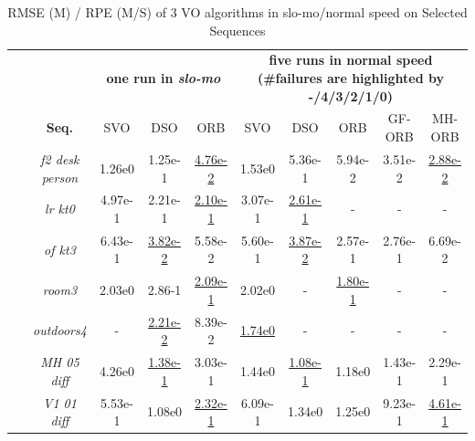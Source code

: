 \begin{table}[t]
	\small
	\centering
	\caption{RMSE (M) / RPE (M/S) of 3 VO algorithms in slo-mo/normal speed on Selected Sequences}
	\begin{tabular}{c|c||c|c|c||c|c|c|c|c}
		\toprule[1pt]
		\midrule[0.1pt]
		\textbf{ } & 
		& \multicolumn{3}{c||}{\bfseries \small one run in \textit{slo-mo}}
		& \multicolumn{5}{c}{\bfseries \small five runs in normal speed (\#failures are highlighted by -/\textcolor{f4}{4}/\textcolor{f3}{3}/\textcolor{f2}{2}/\textcolor{f1}{1}/0)} \\
		\cmidrule{3-10}
		& \textbf{\small Seq.} & SVO\cite{SVO2017} & DSO\cite{DSO2017} & ORB\cite{ORBSLAM}  & SVO\cite{SVO2017} & DSO\cite{DSO2017} & ORB\cite{ORBSLAM} & GF-ORB\cite{zhao2018good2} & MH-ORB\cite{zhao2019maphash} \\
		\midrule
		\  \parbox[t]{1mm}{} \ 
				
		& \textit{f2 desk person}  & 1.26e0 	& 1.25e-1	& \underline{4.76e-2}  & \textcolor{f1}{1.53e0}& \textcolor{f0}{5.36e-1}& \textcolor{f0}{5.94e-2} & \textcolor{f0}{3.51e-2} &  \underline{\textcolor{f0}{2.88e-2}}\\
		
		& \textit{lr kt0}			& 4.97e-1	& 2.21e-1	&	\underline{2.10e-1}	 & \textcolor{f0}{3.07e-1} & \underline{\textcolor{f0}{2.61e-1}} & - & - & -			\\		
		
		& \textit{of kt3}			& 6.43e-1	& \underline{3.82e-2}	&	5.58e-2		 &\textcolor{f0}{5.60e-1} & \underline{\textcolor{f0}{3.87e-2}}&\textcolor{f0}{2.57e-1} & \textcolor{f0}{2.76e-1} & 	 \textcolor{f0}{6.69e-2}	\\
		
		& \textit{room3}  			& 2.03e0	& 2.86-1	& \underline{2.09e-1}  & \textcolor{f2}{2.02e0}& - & \underline{\textcolor{f2}{1.80e-1}} & -&  -\\ 		
		
		& \textit{outdoors4}  		& -		 	& \underline{2.21e-2} 	& 8.39e-2  & \underline{\textcolor{f3}{1.74e0}}& - & - & -&  -\\ 
				
		& \textit{MH 05 diff}  		& 4.26e0 	& \underline{1.38e-1}	& 3.03e-1 &  \textcolor{f1}{1.44e0} & \underline{\textcolor{f4}{1.08e-1}}& \textcolor{f0}{1.18e0} & \textcolor{f0}{1.43e-1} & \textcolor{f0}{2.29e-1}\\ 
		
		& \textit{V1 01 diff}  		& 5.53e-1 	& 1.08e0 	& \underline{2.32e-1}  & \textcolor{f0}{6.09e-1} & \textcolor{f0}{1.34e0}& \textcolor{f3}{1.25e0}& \textcolor{f4}{9.23e-1}&  \underline{\textcolor{f2}{4.61e-1}}\\ 
		

\end{tabular}
\end{table}
